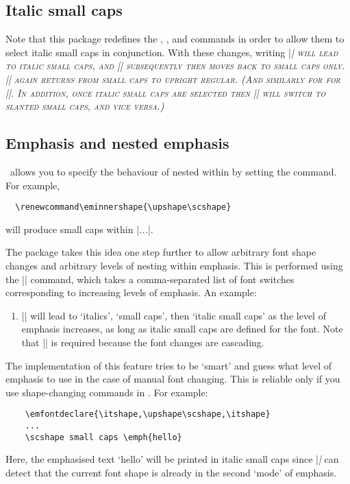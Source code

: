 \documentclass[a4paper]{l3doc}
\begin{document}
\subsection{Italic small caps}

\DescribeMacro{\itshape}
\DescribeMacro{\slshape}
\DescribeMacro{\scshape}
Note that this package redefines the , , and  commands in order to allow them to select italic small caps in conjunction.
With these changes, writing |\itshape\scshape| will lead to italic small caps, and |\upshape| subsequently then moves back to small caps only. |\upshape| again returns from small caps to upright regular.
(And similarly for for |\slshape|. In addition, once italic small caps are selected then |\slshape| will switch to slanted small caps, and vice versa.)


\subsection{Emphasis and nested emphasis}

\DescribeMacro{\eminnershape}
\LaTeXe\ allows you to specify the behaviour of  nested within  by setting the  command.
For example,
\begin{Verbatim}
  \renewcommand\eminnershape{\upshape\scshape}
\end{Verbatim}
will produce small caps within |\emph{\emph{...}}|.

\DescribeMacro{\emfontdeclare}
The  package takes this idea one step further to allow arbitrary font shape changes and arbitrary levels of nesting within emphasis.
This is performed using the |\emfontdeclare| command, which takes a comma-separated list of font switches corresponding to increasing levels of emphasis.
An example:
\begin{enumerate}
\item |\emfontdeclare{\itshape,\upshape\scshape,\itshape}| will lead to `italics', `small caps', then `italic small caps' as the level of emphasis increases, as long as italic small caps are defined for the font.
  Note that |\upshape| is required because the font changes are cascading.
\end{enumerate}
The implementation of this feature tries to be `smart' and guess what level of emphasis to use in the case of manual font changing.
This is reliable only if you use shape-changing commands in .
For example:
\begin{Verbatim}
    \emfontdeclare{\itshape,\upshape\scshape,\itshape}
    ...
    \scshape small caps \emph{hello}
\end{Verbatim}
Here, the emphasised text `hello' will be printed in italic small caps since |\emph| can detect that the current font shape is already in the second `mode' of emphasis.
\end{document}
